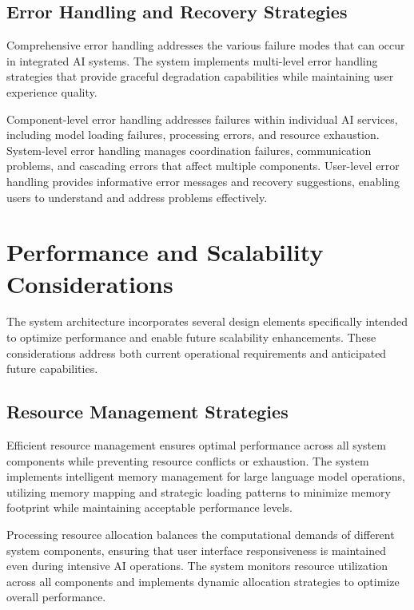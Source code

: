 \subsection{Error Handling and Recovery Strategies}

Comprehensive error handling addresses the various failure modes that can occur in integrated AI systems. The system implements multi-level error handling strategies that provide graceful degradation capabilities while maintaining user experience quality.

Component-level error handling addresses failures within individual AI services, including model loading failures, processing errors, and resource exhaustion. System-level error handling manages coordination failures, communication problems, and cascading errors that affect multiple components. User-level error handling provides informative error messages and recovery suggestions, enabling users to understand and address problems effectively.

\section{Performance and Scalability Considerations}

The system architecture incorporates several design elements specifically intended to optimize performance and enable future scalability enhancements. These considerations address both current operational requirements and anticipated future capabilities.

\subsection{Resource Management Strategies}

Efficient resource management ensures optimal performance across all system components while preventing resource conflicts or exhaustion. The system implements intelligent memory management for large language model operations, utilizing memory mapping and strategic loading patterns to minimize memory footprint while maintaining acceptable performance levels.

Processing resource allocation balances the computational demands of different system components, ensuring that user interface responsiveness is maintained even during intensive AI operations. The system monitors resource utilization across all components and implements dynamic allocation strategies to optimize overall performance.


